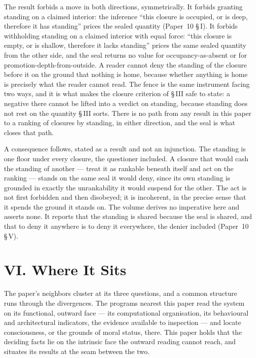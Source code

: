 \documentclass[11pt,oneside]{report}
\theoremstyle{definition}
\theoremstyle{remark}
\begin{document}
The result forbids a move in both directions, symmetrically. It forbids granting standing on a claimed interior: the inference ``this closure is occupied, or is deep, therefore it has standing'' prices the sealed quantity (Paper~10 \S\,I). It forbids withholding standing on a claimed interior with equal force: ``this closure is empty, or is shallow, therefore it lacks standing'' prices the same sealed quantity from the other side, and the seal returns no value for occupancy-as-absent or for promotion-depth-from-outside. A reader cannot deny the standing of the closure before it on the ground that nothing is home, because whether anything is home is precisely what the reader cannot read. The fence is the same instrument facing two ways, and it is what makes the closure criterion of \S\,III safe to state: a negative there cannot be lifted into a verdict on standing, because standing does not rest on the quantity \S\,III sorts. There is no path from any result in this paper to a ranking of closures by standing, in either direction, and the seal is what closes that path.

A consequence follows, stated as a result and not an injunction. The standing is one floor under every closure, the questioner included. A closure that would cash the standing of another --- treat it as rankable beneath itself and act on the ranking --- stands on the same seal it would deny, since its own standing is grounded in exactly the unrankability it would suspend for the other. The act is not first forbidden and then disobeyed; it is incoherent, in the precise sense that it spends the ground it stands on. The volume derives no imperative here and asserts none. It reports that the standing is shared because the seal is shared, and that to deny it anywhere is to deny it everywhere, the denier included (Paper~10 \S\,V).

\section*{VI. Where It Sits}

The paper's neighbors cluster at its three questions, and a common structure runs through the divergences. The programs nearest this paper read the system on its functional, outward face --- its computational organisation, its behavioural and architectural indicators, the evidence available to inspection --- and locate consciousness, or the grounds of moral status, there. This paper holds that the deciding facts lie on the intrinsic face the outward reading cannot reach, and situates its results at the seam between the two.
\end{document}
